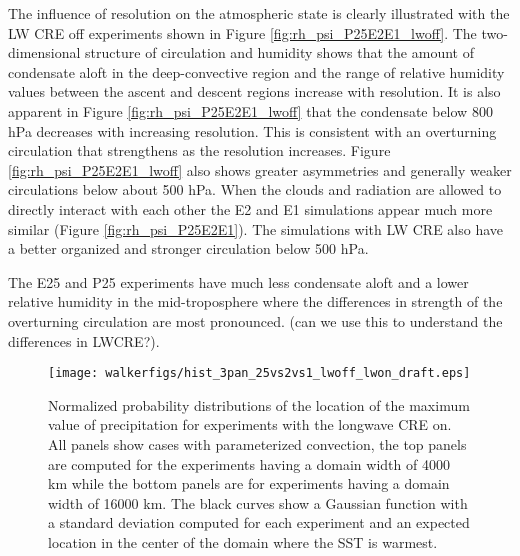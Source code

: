 \documentclass[11pt]{article}   	%
\begin{document}
The influence of resolution on the atmospheric state is clearly illustrated with the LW CRE off experiments shown 
in Figure \ref{fig:rh_psi_P25E2E1_lwoff}.
The two-dimensional structure of circulation and humidity shows that the amount of condensate aloft in the 
deep-convective region and the range of relative
humidity values between the ascent and descent regions increase with resolution.  It is also apparent in Figure
\ref{fig:rh_psi_P25E2E1_lwoff} that the condensate below 800 hPa decreases with increasing resolution.  
This is consistent with an overturning circulation that 
strengthens as the resolution increases.  Figure \ref{fig:rh_psi_P25E2E1_lwoff} also shows greater asymmetries 
and generally weaker circulations below about 500 hPa.  
When the clouds and radiation are allowed to directly interact with each other the E2 and E1 simulations 
appear much more similar (Figure \ref{fig:rh_psi_P25E2E1}).  The simulations with LW CRE also have a better
organized and stronger circulation below 500 hPa.     

The E25 and P25 experiments have much less condensate aloft and a lower relative humidity in the mid-troposphere
where the differences in strength of the overturning circulation are most pronounced. 
(can we use this to understand the differences in LWCRE?).  

\begin{figure}
  \centering
       \texttt{[image: walkerfigs/hist\_3pan\_25vs2vs1\_lwoff\_lwon\_draft.eps]}
  \caption{Normalized probability distributions of the location of the maximum value of precipitation for experiments with the 
  longwave CRE on.  All panels show cases with parameterized convection, the top panels are computed for the experiments 
  having a domain width of 4000 km while the bottom panels are for experiments having a domain width of 16000 km.  The 
  black curves show a Gaussian function with a standard deviation computed for each experiment and an expected location 
  in the center of the domain where the SST is warmest. }
\end{figure}
\end{document}
